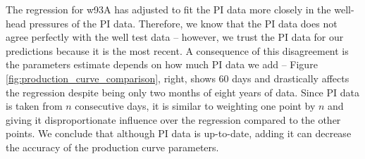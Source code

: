\documentclass[a4paper, 12pt]{article}
\begin{document}
The regression for w93A has adjusted to fit the PI data more closely in the well-head pressures of the PI data. Therefore, we know that the PI data does not agree perfectly with the well test data -- however, we trust the PI data for our predictions because it is the most recent. A consequence of this disagreement is the parameters estimate depends on how much PI data we add -- Figure \ref{fig:production_curve_comparison}, right, shows 60 days and drastically affects the regression despite being only two months of eight years of data. Since PI data is taken from $n$ consecutive days, it is similar to weighting one point by $n$ and giving it disproportionate influence over the regression compared to the other points. We conclude that although PI data is up-to-date, adding it can decrease the accuracy of the production curve parameters.
\end{document}
